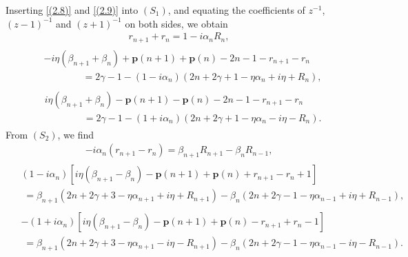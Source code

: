 \documentclass[11pt,a4paper]{article}
\numberwithin{equation}{section}
\begin{document}
Inserting \eqref{(2.8)} and \eqref{(2.9)} into {$(S_1)$}, and equating the coefficients of
$z^{-1}$, $(z-1)^{-1}$ and $(z+1)^{-1}$ on both sides, we obtain
\begin{gather}
r_{n+1}+r_{n}=1-\mathit{i}\alpha_{n}R_{n},\label{(2.12)}
\end{gather}
\begin{gather}
	\begin{split}
&-\mathit{i}\eta(\beta_{n+1}+\beta_{n})+\textbf{p}(n+1)+\textbf{p}(n)-2n-1-r_{n+1}-r_{n}\\
&\qquad\qquad=2\gamma-1-(1-\mathit{i}\alpha_{n})(2n+2\gamma+1-\eta\alpha_{n}+\mathit{i}\eta+R_{n}),\label{(2.13)}
	\end{split}
\end{gather}
\begin{gather}
	\begin{split}
&\mathit{i}\eta(\beta_{n+1}+\beta_{n})-\textbf{p}(n+1)-\textbf{p}(n)-2n-1-r_{n+1}-r_{n}\\
&\qquad\qquad=2\gamma-1-(1+\mathit{i}\alpha_{n})(2n+2\gamma+1-\eta\alpha_{n}-\mathit{i}\eta-R_{n}).\label{(2.14)}
	\end{split}
\end{gather}
From $(S_2)$, we find
\begin{gather}
-\mathit{i}\alpha_{n}(r_{n+1}-r_{n})=\beta_{n+1}R_{n+1}-\beta_{n}R_{n-1},\label{(2.16)}
\end{gather}
\begin{gather}
\begin{split}
&\left(1-\mathit{i}\alpha_{n}\right)\left[\mathit{i}\eta(\beta_{n+1}-\beta_{n})-\textbf{p}(n+1)+\textbf{p}(n)+r_{n+1}-r_{n}+1\right]\\
&\;=\beta_{n+1}\left(2n+2\gamma+3-\eta\alpha_{n+1}+\mathit{i}\eta+R_{n+1}\right)-\beta_{n}\left(2n+2\gamma-1-\eta\alpha_{n-1}+\mathit{i}\eta+R_{n-1}\right),\label{(2.17)}
\end{split}
\end{gather}
\begin{gather}
	\begin{split}
&-\left(1+\mathit{i}\alpha_{n}\right)\left[\mathit{i}\eta(\beta_{n+1}-\beta_{n})-\textbf{p}(n+1)+\textbf{p}(n)-r_{n+1}+r_{n}-1\right]\\
&\;=\beta_{n+1}\left(2n+2\gamma+3-\eta\alpha_{n+1}-\mathit{i}\eta-R_{n+1}\right)-\beta_{n}\left(2n+2\gamma-1-\eta\alpha_{n-1}-\mathit{i}\eta-R_{n-1}\right).\label{(2.18)}
\end{split}
\end{gather}
\end{document}
